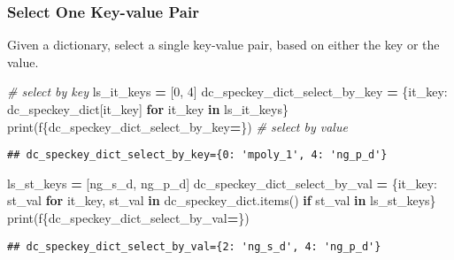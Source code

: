 \documentclass[
]{book}
\newenvironment{Shaded}{\begin{snugshade}}{\end{snugshade}}
\newcommand{\BuiltInTok}[1]{#1}
\newcommand{\CommentTok}[1]{\textcolor[rgb]{0.56,0.35,0.01}{\textit{#1}}}
\newcommand{\ControlFlowTok}[1]{\textcolor[rgb]{0.13,0.29,0.53}{\textbf{#1}}}
\newcommand{\DecValTok}[1]{\textcolor[rgb]{0.00,0.00,0.81}{#1}}
\newcommand{\KeywordTok}[1]{\textcolor[rgb]{0.13,0.29,0.53}{\textbf{#1}}}
\newcommand{\NormalTok}[1]{#1}
\newcommand{\OperatorTok}[1]{\textcolor[rgb]{0.81,0.36,0.00}{\textbf{#1}}}
\newcommand{\SpecialCharTok}[1]{\textcolor[rgb]{0.00,0.00,0.00}{#1}}
\newcommand{\SpecialStringTok}[1]{\textcolor[rgb]{0.31,0.60,0.02}{#1}}
\newcommand{\StringTok}[1]{\textcolor[rgb]{0.31,0.60,0.02}{#1}}
\begin{document}
\hypertarget{select-one-key-value-pair}{%
\subsubsection{Select One Key-value Pair}\label{select-one-key-value-pair}}

Given a dictionary, select a single key-value pair, based on either the key or the value.

\begin{Shaded}
\begin{Highlighting}[]
\CommentTok{\# select by key}
\NormalTok{ls\_it\_keys }\OperatorTok{=}\NormalTok{ [}\DecValTok{0}\NormalTok{, }\DecValTok{4}\NormalTok{]}
\NormalTok{dc\_speckey\_dict\_select\_by\_key }\OperatorTok{=}\NormalTok{ \{it\_key: dc\_speckey\_dict[it\_key] }\ControlFlowTok{for}\NormalTok{ it\_key }\KeywordTok{in}\NormalTok{ ls\_it\_keys\}}
\BuiltInTok{print}\NormalTok{(}\SpecialStringTok{f\textquotesingle{}}\SpecialCharTok{\{}\NormalTok{dc\_speckey\_dict\_select\_by\_key}\OperatorTok{=}\SpecialCharTok{\}}\SpecialStringTok{\textquotesingle{}}\NormalTok{)}
\CommentTok{\# select by value}
\end{Highlighting}
\end{Shaded}

\begin{verbatim}
## dc_speckey_dict_select_by_key={0: 'mpoly_1', 4: 'ng_p_d'}
\end{verbatim}

\begin{Shaded}
\begin{Highlighting}[]
\NormalTok{ls\_st\_keys }\OperatorTok{=}\NormalTok{ [}\StringTok{\textquotesingle{}ng\_s\_d\textquotesingle{}}\NormalTok{, }\StringTok{\textquotesingle{}ng\_p\_d\textquotesingle{}}\NormalTok{]}
\NormalTok{dc\_speckey\_dict\_select\_by\_val }\OperatorTok{=}\NormalTok{ \{it\_key: st\_val }\ControlFlowTok{for}\NormalTok{ it\_key, st\_val }\KeywordTok{in}\NormalTok{ dc\_speckey\_dict.items() }
                                 \ControlFlowTok{if}\NormalTok{ st\_val }\KeywordTok{in}\NormalTok{ ls\_st\_keys\}}
\BuiltInTok{print}\NormalTok{(}\SpecialStringTok{f\textquotesingle{}}\SpecialCharTok{\{}\NormalTok{dc\_speckey\_dict\_select\_by\_val}\OperatorTok{=}\SpecialCharTok{\}}\SpecialStringTok{\textquotesingle{}}\NormalTok{)}
\end{Highlighting}
\end{Shaded}

\begin{verbatim}
## dc_speckey_dict_select_by_val={2: 'ng_s_d', 4: 'ng_p_d'}
\end{verbatim}
\end{document}

